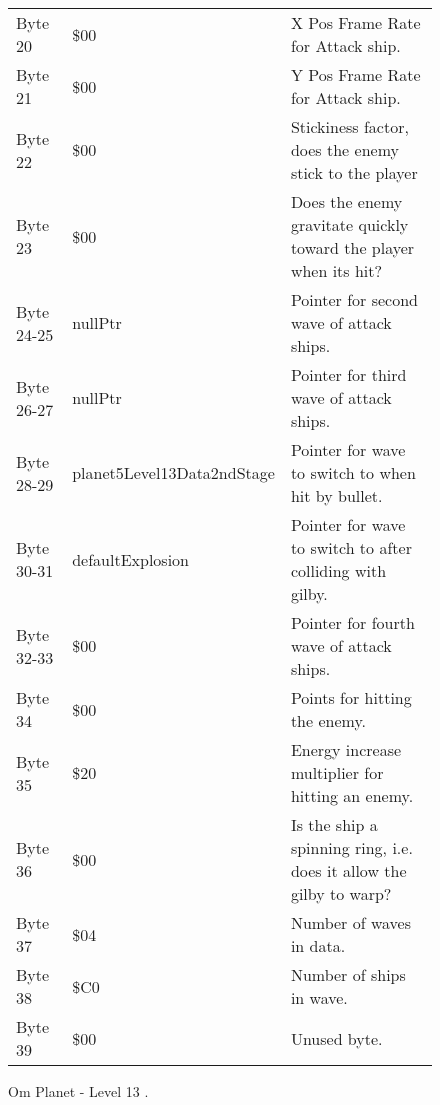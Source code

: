 \begin{figure}[H]
{\begin{adjustbox}{width=12cm}
\begin{tabular}{lll}
 Byte 20    & \$00                        & X Pos Frame Rate for Attack ship.                                   \\
 Byte 21    & \$00                        & Y Pos Frame Rate for Attack ship.                                   \\
 Byte 22    & \$00                        & Stickiness factor, does the enemy stick to the player               \\
 Byte 23    & \$00                        & Does the enemy gravitate quickly toward the player when its hit?    \\
 Byte 24-25 & nullPtr                    & Pointer for second wave of attack ships.                            \\
 Byte 26-27 & nullPtr                    & Pointer for third wave of attack ships.                             \\
 Byte 28-29 & planet5Level13Data2ndStage & Pointer for wave to switch to when hit by bullet.                   \\
 Byte 30-31 & defaultExplosion           & Pointer for  wave to switch to after colliding with gilby.          \\
 Byte 32-33 & \$00                        & Pointer for fourth wave of attack ships.                            \\
 Byte 34    & \$00                        & Points for hitting the enemy.                                       \\
 Byte 35    & \$20                        & Energy increase multiplier for hitting an enemy.                    \\
 Byte 36    & \$00                        & Is the ship a spinning ring, i.e. does it allow the gilby to warp?  \\
 Byte 37    & \$04                        & Number of waves in data.                                            \\
 Byte 38    & \$C0                        & Number of ships in wave.                                            \\
 Byte 39    & \$00                        & Unused byte.                                                        \\
\bottomrule
\end{tabular}

  \end{adjustbox}

  }\caption*{Om Planet - Level 13
.}
\end{figure}

